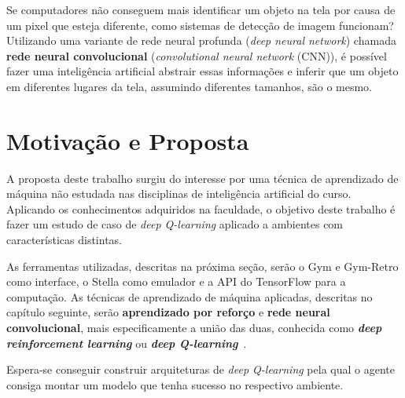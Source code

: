 Se computadores não conseguem mais identificar um objeto na tela por causa de um pixel que esteja diferente, como sistemas de detecção de imagem funcionam?
Utilizando uma variante de rede neural profunda (\textit{deep neural network}) chamada \textbf{rede neural convolucional} (\textit{convolutional neural network} (CNN)), é possível fazer uma inteligência artificial abstrair essas informações e inferir que um objeto em diferentes lugares da tela, assumindo diferentes tamanhos, são o mesmo.

\section{Motivação e Proposta}
\label{sec:motivacao_proposta}

A proposta deste trabalho surgiu do interesse por uma técnica de aprendizado de máquina não estudada nas disciplinas de inteligência artificial do curso.
Aplicando os conhecimentos adquiridos na faculdade, o objetivo deste trabalho é fazer um estudo de caso de \textit{deep Q-learning} aplicado a ambientes com características distintas.

As ferramentas utilizadas, descritas na próxima seção, serão o Gym e Gym-Retro como interface, o Stella como emulador e a API do TensorFlow para a computação.
As técnicas de aprendizado de máquina aplicadas, descritas no capítulo seguinte, serão \textbf{aprendizado por reforço} e \textbf{rede neural convolucional}, mais especificamente a união das duas, conhecida como \textit{\textbf{deep reinforcement learning}} ou \textit{\textbf{deep Q-learning}}~\cite{DBLP:journals/corr/MnihKSGAWR13}.

Espera-se conseguir construir arquiteturas de \textit{deep Q-learning} pela qual o agente consiga montar um modelo que tenha sucesso no respectivo ambiente.

